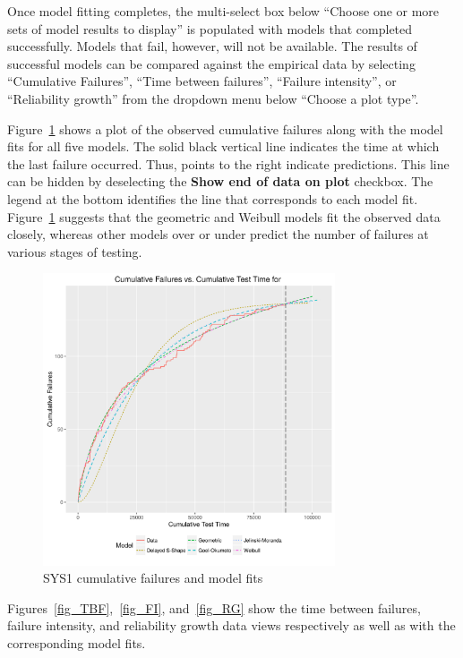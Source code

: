\documentclass[conference]{IEEEtran}
\begin{document}
Once model fitting completes, the multi-select box below ``Choose one or more sets of model results to display'' is populated with models that completed successfully. Models that fail, however, will not be available. The results of successful models can be compared against the empirical data by selecting ``Cumulative Failures'', ``Time between failures'', ``Failure intensity'', or ``Reliability growth'' from the dropdown menu below ``Choose a plot type''.

Figure~\ref{fig_SYS1_Cum} shows a plot of the observed cumulative failures along with the model fits for all five models. The solid black vertical line indicates the time at which the last failure occurred. Thus, points to the right indicate predictions. This line can be hidden by deselecting the \textbf{Show end of data on plot} checkbox. The legend at the bottom identifies the line that corresponds to each model fit. Figure~\ref{fig_SYS1_Cum} suggests that the geometric and Weibull models fit the observed data closely, whereas other models over or under predict the number of failures at various stages of testing.

\begin{figure}[!h]
\centering
\includegraphics[width=3.4in]{Figures/SRT6}
\caption{SYS1 cumulative failures and model fits}
\label{fig_SYS1_Cum}
\end{figure}


Figures~\ref{fig_TBF},~\ref{fig_FI}, and~\ref{fig_RG} show the time between failures, failure intensity, and reliability growth data views respectively as well as with the corresponding model fits.
\end{document}
